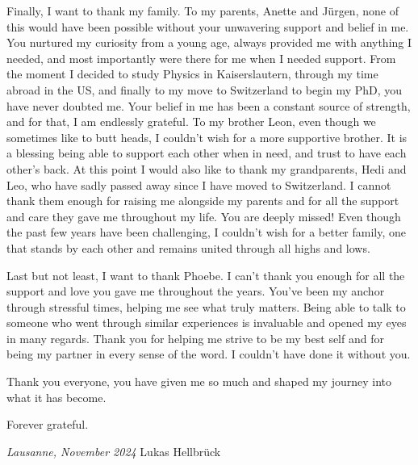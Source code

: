Finally, I want to thank my family.
To my parents, Anette and Jürgen, none of this would have been possible without your unwavering support and belief in me.
You nurtured my curiosity from a young age, always provided me with anything I needed, and most importantly were there for me when I needed support.
From the moment I decided to study Physics in Kaiserslautern, through my time abroad in the US, and finally to my move to Switzerland to begin my PhD, you have never doubted me. Your belief in me has been a constant source of strength, and for that, I am endlessly grateful.
To my brother Leon, even though we sometimes like to butt heads, I couldn't wish for a more supportive brother.
It is a blessing being able to support each other when in need, and trust to have each other's back.
At this point I would also like to thank my grandparents, Hedi and Leo, who have sadly passed away since I have moved to Switzerland.
I cannot thank them enough for raising me alongside my parents and for all the support and care they gave me throughout my life.
You are deeply missed!
Even though the past few years have been challenging, I couldn’t wish for a better family, one that stands by each other and remains united through all highs and lows.\hfill\break

Last but not least, I want to thank Phoebe.
I can't thank you enough for all the support and love you gave me throughout the years.
You’ve been my anchor through stressful times, helping me see what truly matters.
Being able to talk to someone who went through similar experiences is invaluable and opened my eyes in many regards.
Thank you for helping me strive to be my best self and for being my partner in every sense of the word.
I couldn’t have done it without you.\hfill\break

Thank you everyone, you have given me so much and shaped my journey into what it has become.

Forever grateful.

\bigskip
 
\noindent\textit{Lausanne, November 2024}
\hfill Lukas Hellbrück
